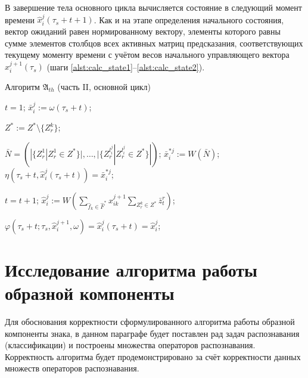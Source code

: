 В завершение тела основного цикла вычисляется состояние в следующий момент времени $\hat x_i^j(\tau_s+t+1)$. Как и на этапе определения начального состояния, вектор ожиданий равен нормированному вектору, элементы которого равны сумме элементов столбцов всех активных матриц предсказания, соответствующих текущему моменту времени с учётом весов начального управляющего вектора $\hat x_i^{j+1}(\tau_s)$ (шаги \ref{alst:calc_state1}--\ref{alst:calc_state2}).
\begin{algorithm}[H]
	\caption{Алгоритм $\mathfrak{A}_{th}$ (часть II, основной цикл)}\label{alg:th_cycle}
	\begin{algorithmic}[1]
		\State $t=1$;
		 \label{alst:cycle_start}
			\State $\bar{x}_i^j:=\omega(\tau_s+t)$;

				 \label{alst:update_z}
					\State $Z^*:=Z^*\setminus\{Z_r^k\}$;
				\EndIf
			\EndFor

			\State $\bar N=(|\{Z_r^1|Z_r^1\in Z^*\}|,\dots,|\{Z_r^{l_i^j}|Z_r^{l_i^j}\in Z^*\}|)$; \label{alst:calc_out1}
			\State $\bar{x}_i^{*j}:=W(\bar N)$; \label{alst:calc_out2}
			\State $\eta(\tau_s+t, \hat{x}_i^j(\tau_s+t))=\bar{x}_i^{*j}$; \label{alst:calc_out3}
						
			\State $t=t+1$;
				\State $\hat{x}_i^j:=W(\sum_{\hat f_k\in\hat F^*}\hat x_{ik}^{j+1}\sum_{Z_r^k\in Z^*}\bar z_t^r)$; \label{alst:calc_state1}
							
				\State $\varphi(\tau_s+t;\tau_s,\hat{x}_i^{j+1}, \omega)=\hat{x}_i^j(\tau_s+t)=\hat{x}_i^j$; \label{alst:calc_state2}
			\EndIf
		\EndWhile \label{alst:cycle_end}
	\end{algorithmic}
\end{algorithm}

\section{Исследование алгоритма работы образной компоненты}\label{sect3_2}

Для обоснования корректности сформулированного алгоритма работы образной компоненты знака, в данном параграфе будет поставлен рад задач распознавания (классификации) и построены множества операторов распознавания. Корректность алгоритма будет продемонстрировано за счёт корректности данных множеств операторов распознавания.

